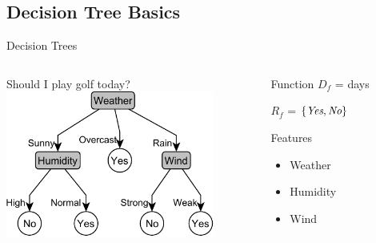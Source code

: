 \documentclass[12pt]{beamer}
\newcommand{\EM}[1]{\mbox{\em#1}}
\begin{document}
\subsection{Decision Tree Basics}
\begin{frame}{Decision Trees}
	\begin{columns}
		\begin{column}{2.7in}
			\centering
			Should I play golf today? \\
			\bigskip
			\includegraphics[width=2.7in]{play_golf}
		\end{column}
		\begin{column}{1.5in}
			\begin{block}{Function}
				$D_f$ = days
				
				$R_f$ = $\{\EM{Yes}, \EM{No}\}$
			\end{block}
			\bigskip
			\begin{block}{Features}
				\begin{itemize}
					\item Weather
					\item Humidity
					\item Wind
				\end{itemize}
			\end{block}
		\end{column}
	\end{columns}
\end{frame}
\end{document}
